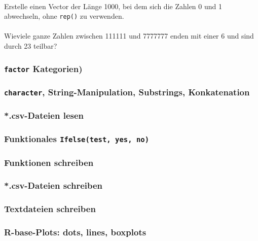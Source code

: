 \documentclass[paper=A4, pagesize, DIV=calc, smallheadings,
fontsize=12pt, expansion=false]{scrreprt}
\begin{document}
\paragraph{}
Erstelle einen Vector der Länge 1000, bei dem sich die Zahlen 0 und 1 abwechseln, ohne \texttt{rep()} zu verwenden.

\paragraph{}
Wieviele ganze Zahlen zwischen 111111 und 7777777 enden mit einer 6 und sind durch 23 teilbar?

\subsubsection*{\texttt{\textbf{factor}} Kategorien)}

\subsubsection*{\texttt{character}, String-Manipulation, Substrings, Konkatenation}
  
\subsubsection*{*.csv-Dateien lesen}


\subsubsection*{Funktionales \texttt{Ifelse(test, yes, no)}}

\subsubsection*{Funktionen schreiben}

\subsubsection*{*.csv-Dateien schreiben}

\subsubsection*{Textdateien schreiben}


\subsubsection{R-base-Plots: dots, lines, boxplots}
\end{document}
